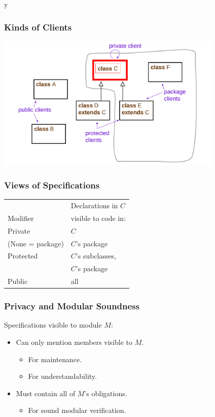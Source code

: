 \if y\MAKEHANDOUTS \documentclass[t,compress,landscape,handout]{beamer}
\begin{document}
\begin{frame}
\frametitle{Kinds of Clients}
\includegraphics[width=4.25in]{visibility-modifiers}
\end{frame}

\begin{frame}
\frametitle{Views of Specifications}
\begin{tabular}{ll}
         & Declarations in $C$ \\
Modifier & visible to code in: \\
\hline
Private          & $C$ \\
(None = package) & $C$'s package \\
Protected        & $C$'s subclasses, \\
                 & $C$'s package \\
Public           & all
\end{tabular}
\end{frame}

\begin{frame}
\frametitle{Privacy and Modular Soundness}
Specifications visible to module $M$:
\begin{itemize}
\item
Can only mention members visible to $M$.
\begin{itemize}
\item
For maintenance.

\item
For understandability.
\end{itemize}

\item
Must contain all of $M$'s obligations.
\begin{itemize}
\item
For sound modular verification.
\end{itemize}
\end{itemize}
\end{frame}
\end{document}

